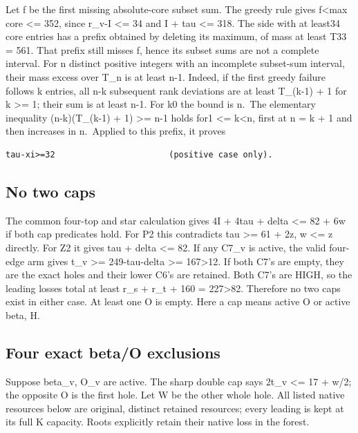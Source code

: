 \documentclass[11pt,a4paper]{article}
\begin{document}
Let f be the first missing absolute-core subset sum. The greedy rule
gives f\textless max core \textless= 352, since r\_v-I \textless= 34 and
I + tau \textless= 318. The side with at least34 core entries has a
prefix obtained by deleting its maximum, of mass at least T33 = 561.
That prefix still misses f, hence its subset sums are not a complete
interval. For n distinct positive integers with an incomplete subset-sum
interval, their mass excess over T\_n is at least n-1. Indeed, if the
first greedy failure follows k entries, all n-k subsequent rank
deviations are at least T\_(k-1) + 1 for k \textgreater= 1; their sum is
at least n-1. For k0 the bound is n.~The elementary inequality
(n-k)(T\_(k-1) + 1) \textgreater= n-1 holds for1 \textless=
k\textless n, first at n = k + 1 and then increases in n.~Applied to
this prefix, it proves

\begin{verbatim}
tau-xi>=32                       (positive case only).
\end{verbatim}

\hypertarget{no-two-caps}{%
\subsection{No two caps}\label{no-two-caps}}

The common four-top and star calculation gives 4I + 4tau + delta
\textless= 82 + 6w if both cap predicates hold. For P2 this contradicts
tau \textgreater= 61 + 2z, w \textless= z directly. For Z2 it gives tau
+ delta \textless= 82. If any C7\_v is active, the valid four-edge arm
gives t\_v \textgreater= 249-tau-delta \textgreater= 167\textgreater12.
If both C7's are empty, they are the exact holes and their lower C6's
are retained. Both C7's are HIGH, so the leading losses total at least
r\_s + r\_t + 160 = 227\textgreater82. Therefore no two caps exist in
either case. At least one O is empty. Here a cap means active O or
active beta, H.

\hypertarget{four-exact-betao-exclusions}{%
\subsection{Four exact beta/O
exclusions}\label{four-exact-betao-exclusions}}

Suppose beta\_v, O\_v are active. The sharp double cap says 2t\_v
\textless= 17 + w/2; the opposite O is the first hole. Let W be the
other whole hole. All listed native resources below are original,
distinct retained resources; every leading is kept at its full K
capacity. Roots explicitly retain their native loss in the forest.
\end{document}
